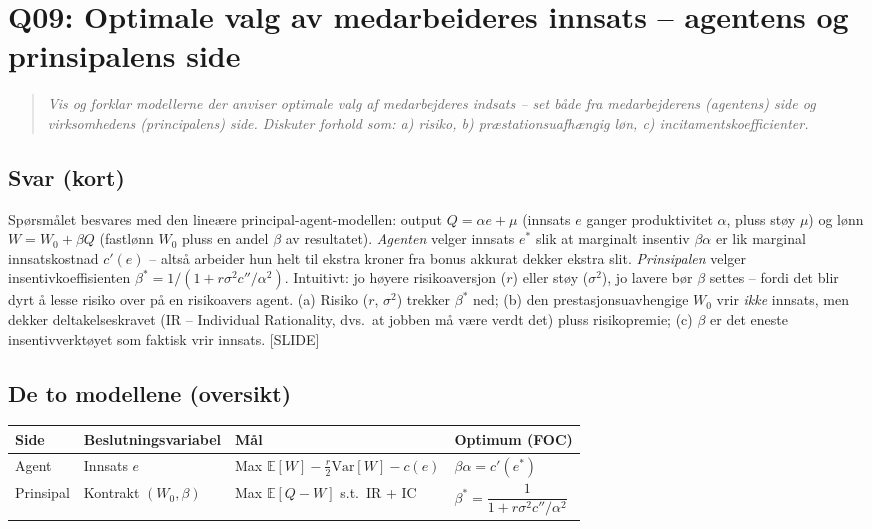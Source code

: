 \section{Q09: Optimale valg av medarbeideres innsats -- agentens og prinsipalens side}\label{q:09}

\begin{quote}
\emph{Vis og forklar modellerne der anviser optimale valg af medarbejderes indsats -- set både fra medarbejderens (agentens) side og virksomhedens (principalens) side. Diskuter forhold som: a) risiko, b) præstationsuafhængig løn, c) incitamentskoefficienter.}
\end{quote}

\subsection*{Svar (kort)}
Spørsmålet besvares med den lineære principal-agent-modellen: output $Q=\alpha e+\mu$ (innsats $e$ ganger produktivitet $\alpha$, pluss støy $\mu$) og lønn $W=W_0+\beta Q$ (fastlønn $W_0$ pluss en andel $\beta$ av resultatet). \emph{Agenten} velger innsats $e^{*}$ slik at marginalt insentiv $\beta\alpha$ er lik marginal innsatskostnad $c'(e)$ -- altså arbeider hun helt til ekstra kroner fra bonus akkurat dekker ekstra slit. \emph{Prinsipalen} velger insentivkoeffisienten $\beta^{*}=1/(1+r\sigma^{2}c''/\alpha^{2})$. Intuitivt: jo høyere risikoaversjon ($r$) eller støy ($\sigma^{2}$), jo lavere bør $\beta$ settes -- fordi det blir dyrt å lesse risiko over på en risikoavers agent. (a) Risiko ($r$, $\sigma^{2}$) trekker $\beta^{*}$ ned; (b) den prestasjonsuavhengige $W_0$ vrir \emph{ikke} innsats, men dekker deltakelseskravet (IR -- Individual Rationality, dvs.\ at jobben må være verdt det) pluss risikopremie; (c) $\beta$ er det eneste insentivverktøyet som faktisk vrir innsats. [SLIDE]

\subsection*{De to modellene (oversikt)}

\begin{center}
\renewcommand{\arraystretch}{1.15}
\begin{tabular}{@{}p{2.8cm}p{3.6cm}p{4.4cm}p{4.6cm}@{}}
\toprule
\textbf{Side} & \textbf{Beslutningsvariabel} & \textbf{Mål} & \textbf{Optimum (FOC)} \\
\midrule
Agent & Innsats $e$ & Max $\mathbb{E}[W]-\tfrac{r}{2}\mathrm{Var}[W]-c(e)$ & $\beta\alpha=c'(e^{*})$ \\
Prinsipal & Kontrakt $(W_0,\beta)$ & Max $\mathbb{E}[Q-W]$ s.t.\ IR + IC & $\beta^{*}=\dfrac{1}{1+r\sigma^{2}c''/\alpha^{2}}$ \\
\bottomrule
\end{tabular}
\end{center}

